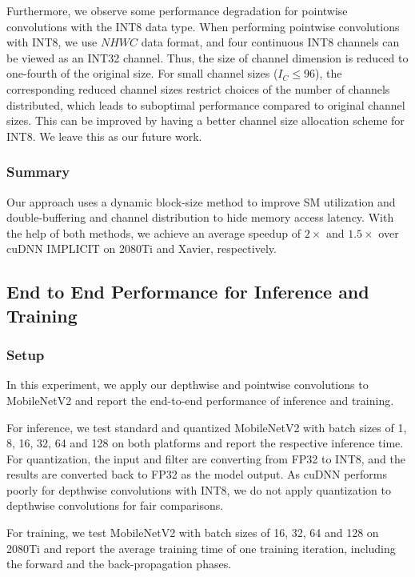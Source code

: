 Furthermore, we observe some performance degradation for pointwise convolutions with the INT8 data type. When performing pointwise
convolutions with INT8, we use $NHWC$ data format, and four continuous INT8 channels can be viewed as an INT32 channel. Thus, the size of
channel dimension is reduced to one-fourth of the original size. For small channel sizes ($I_C \leq 96$), the corresponding reduced channel
sizes restrict choices of the number of channels distributed, which leads to suboptimal performance compared to original channel sizes.
This can be improved by having a better channel size allocation scheme for INT8. We leave this as our future work.

\subsubsection{Summary} Our approach uses a dynamic block-size method to improve SM utilization and double-buffering and channel distribution to hide
memory access latency. With the help of both methods, we achieve an average speedup of $2\times$ and $1.5\times$ over cuDNN IMPLICIT on
2080Ti and Xavier, respectively.





\subsection{End to End Performance for Inference and Training}
\label{sec:inferexp}
\subsubsection{Setup}
In this experiment, we apply our depthwise and pointwise convolutions to MobileNetV2 and report the end-to-end performance of inference and
training.

 For inference, we test standard and quantized MobileNetV2 with batch sizes of 1, 8, 16, 32, 64 and 128 on both
platforms and report the respective inference time. For quantization, the input and filter are converting from FP32 to INT8, and the
results are converted back to FP32 as the model output. As cuDNN performs poorly for depthwise convolutions with INT8, we do not apply
quantization to depthwise convolutions for fair comparisons.

 For training, we test MobileNetV2 with batch sizes of 16, 32, 64 and 128 on 2080Ti and report the average training time
of one training iteration, including the forward and the back-propagation phases.

